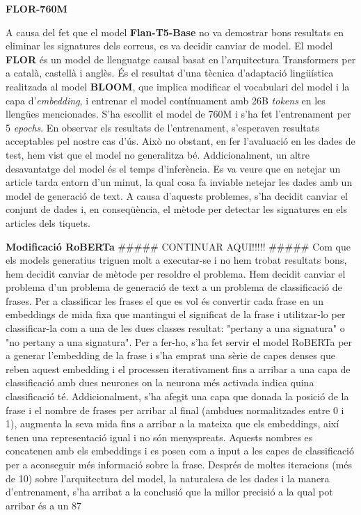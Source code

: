 \textbf{FLOR-760M}

A causa del fet que el model \textbf{Flan-T5-Base} no va demostrar bons resultats en eliminar les signatures dels correus, es va decidir canviar de model. El model \textbf{FLOR} és un model de llenguatge causal basat en l'arquitectura Transformers per a català, castellà i anglès. És el resultat d'una tècnica d'adaptació lingüística realitzada al model \textbf{BLOOM}, que implica modificar el vocabulari del model i la capa d'\textit{embedding}, i entrenar el model contínuament amb 26B \textit{tokens} en les llengües mencionades. S'ha escollit el model de 760M i s'ha fet l'entrenament per 5 \textit{epochs}.
En observar els resultats de l'entrenament, s'esperaven resultats acceptables pel nostre cas d'ús. Això no obstant, en fer l'avaluació en les dades de test, hem vist que el model no generalitza bé. Addicionalment, un altre desavantatge del model és el temps d'inferència. Es va veure que en netejar un article tarda entorn d'un minut, la qual cosa fa inviable netejar les dades amb un model de generació de text.
A causa d'aquests problemes, s'ha decidit canviar el conjunt de dades i, en conseqüència, el mètode per detectar les signatures en els articles dels tiquets.

\textbf{Modificació RoBERTa}
##### CONTINUAR AQUI!!!!! #####
Com que els models generatius triguen molt a executar-se i no hem trobat resultats bons, hem decidit canviar de mètode per resoldre el problema. Hem decidit canviar el problema d'un problema de generació de text a un problema de classificació de frases. Per a classificar les frases el que es vol és convertir cada frase en un embeddings de mida fixa que mantingui el significat de la frase i utilitzar-lo per classificar-la com a una de les dues classes resultat: "pertany a una signatura" o "no pertany a una signatura". Per a fer-ho, s'ha fet servir el model RoBERTa per a generar l'embedding de la frase i s'ha emprat una sèrie de capes denses que reben aquest embedding i el processen iterativament fins a arribar a una capa de classificació amb dues neurones on la neurona més activada indica quina classificació té.
Addicionalment, s'ha afegit una capa que donada la posició de la frase i el nombre de frases per arribar al final (ambdues normalitzades entre 0 i 1), augmenta la seva mida fins a arribar a la mateixa que els embeddings, així tenen una representació igual i no són menyspreats. Aquests nombres es concatenen amb els embeddings i es posen com a input a les capes de classificació per a aconseguir més informació sobre la frase.
Després de moltes iteracions (més de 10) sobre l'arquitectura del model, la naturalesa de les dades i la manera d'entrenament, s'ha arribat a la conclusió que la millor precisió a la qual pot arribar és a un 87%

